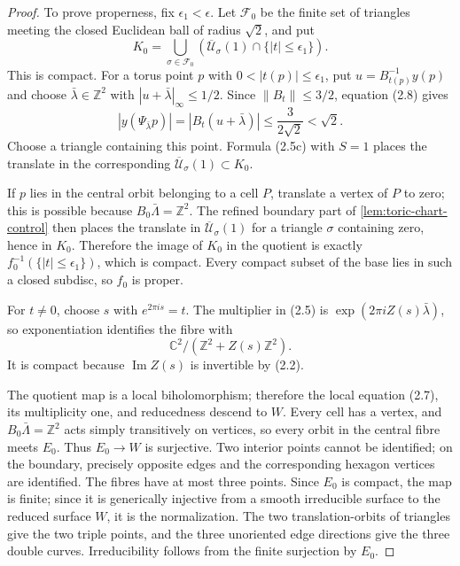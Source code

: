 \begin{proof}
To prove properness, fix \(\epsilon_1<\epsilon\).  Let \(\mathcal F_0\) be
the finite set of triangles meeting the closed Euclidean ball of radius
\(\sqrt2\), and put
\[
 K_0=\bigcup_{\sigma\in\mathcal F_0}
 \left(\overline{\mathcal U}_\sigma(1)
 \cap\{|t|\le\epsilon_1\}\right).
\]
This is compact.  For a torus point \(p\) with
\(0<|t(p)|\le\epsilon_1\), put \(u=B_{t(p)}^{-1}y(p)\) and choose
\(\bar\lambda\in\mathbb Z^2\) with
\(|u+\bar\lambda|_\infty\le1/2\).  Since
\(\|B_t\|\le3/2\), equation (2.8) gives
\[
 |y(\Psi_{\bar\lambda}p)|
 =|B_t(u+\bar\lambda)|
 \le\frac{3}{2\sqrt2}<\sqrt2.
\]
Choose a triangle containing this point.  Formula (2.5c) with \(S=1\)
places the translate in the corresponding
\(\overline{\mathcal U}_\sigma(1)\subset K_0\).

If \(p\) lies in the central orbit belonging to a cell \(P\), translate a
vertex of \(P\) to zero; this is possible because
\(B_0\bar\Lambda=\mathbb Z^2\).  The refined boundary part of
\cref{lem:toric-chart-control} then places the translate in
\(\overline{\mathcal U}_\sigma(1)\) for a triangle \(\sigma\) containing
zero, hence in \(K_0\).  Therefore the image of \(K_0\) in the quotient is
exactly \(f_0^{-1}(\{|t|\le\epsilon_1\})\), which is compact.  Every compact
subset of the base lies in such a closed subdisc, so \(f_0\) is proper.

For \(t\ne0\), choose \(s\) with \(e^{2\pi is}=t\).  The multiplier in
(2.5) is \(\exp(2\pi iZ(s)\bar\lambda)\), so exponentiation identifies the
fibre with
\[
 \mathbb C^2/(\mathbb Z^2+Z(s)\mathbb Z^2).
\]
It is compact because \(\operatorname{Im}Z(s)\) is invertible by (2.2).

The quotient map is a local biholomorphism; therefore the local equation
(2.7), its multiplicity one, and reducedness descend to \(W\).  Every cell
has a vertex, and \(B_0\bar\Lambda=\mathbb Z^2\) acts simply transitively on
vertices, so every orbit in the central fibre meets \(E_0\).  Thus
\(E_0\to W\) is surjective.  Two interior points cannot be identified; on
the boundary, precisely opposite edges and the corresponding hexagon
vertices are identified.  The fibres have at most three points.  Since
\(E_0\) is compact, the map is finite; since it is generically injective
from a smooth irreducible surface to the reduced surface \(W\), it is the
normalization.  The two translation-orbits of triangles give the two triple
points, and the three unoriented edge directions give the three double
curves.  Irreducibility follows from the finite surjection by \(E_0\).
\end{proof}

